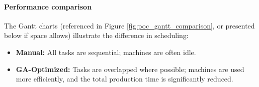 \paragraph{Performance comparison}
The Gantt charts (referenced in Figure \ref{fig:poc_gantt_comparison}, or presented below if space allows) illustrate the difference in scheduling:
\begin{itemize}[nosep,leftmargin=*,topsep=2pt, partopsep=0pt, itemsep=1pt]
    \item \textbf{Manual:} All tasks are sequential; machines are often idle.
    \item \textbf{GA-Optimized:} Tasks are overlapped where possible; machines are used more efficiently, and the total production time is significantly reduced.
\end{itemize}